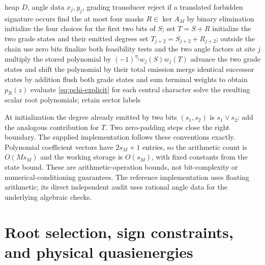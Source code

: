 \documentclass[10pt,letterpaper]{article}
\begin{document}
\begin{algorithm}[H]
\caption{Sector-polynomial computation without many-body matrices}\label{alg:sector-polynomial}
\begin{algorithmic}[1]
\Require heap $D$, angle data $x_j,y_j$, grading transducer
\State reject if a translated forbidden signature occurs
\State find the at most four masks $R\in\ker A_M$ by binary elimination
 \State initialize the four choices for the first two bits of $S$; set $T=S+R$
 \State initialize the two grade states and their emitted degrees
   \State set $T_{j+2}=S_{j+2}+R_{j+2}$; outside the chain use zero bits
   \State finalize both feasibility tests and the two angle factors at site $j$
   \State multiply the stored polynomial by $(-1)^{\eta_j}w_j(S)w_j(T)$
   \State advance the two grade states and shift the polynomial by their total emission
   \State merge identical successor states by addition
  \EndFor
 \EndFor
 \State flush both grade states and sum terminal weights to obtain $p_R(z)$
\EndFor
\State evaluate \eqref{eq:pchi-explicit} for each central character
\State solve the resulting scalar root polynomials; retain sector labels
\end{algorithmic}
\end{algorithm}

At initialization the degree already emitted by two bits $(s_1,s_2)$ is $s_1\lor s_2$; add the analogous contribution for $T$. Two zero-padding steps close the right boundary. The supplied implementation follows these conventions exactly. Polynomial coefficient vectors have $2s_M+1$ entries, so the arithmetic count is $O(Ms_M)$ and the working storage is $O(s_M)$, with fixed constants from the state bound. These are arithmetic-operation bounds, not bit-complexity or numerical-conditioning guarantees. The reference implementation uses floating arithmetic; its direct independent audit uses rational angle data for the underlying algebraic checks.

\section{Root selection, sign constraints, and physical quasienergies}\label{supp:roots}
\end{document}
